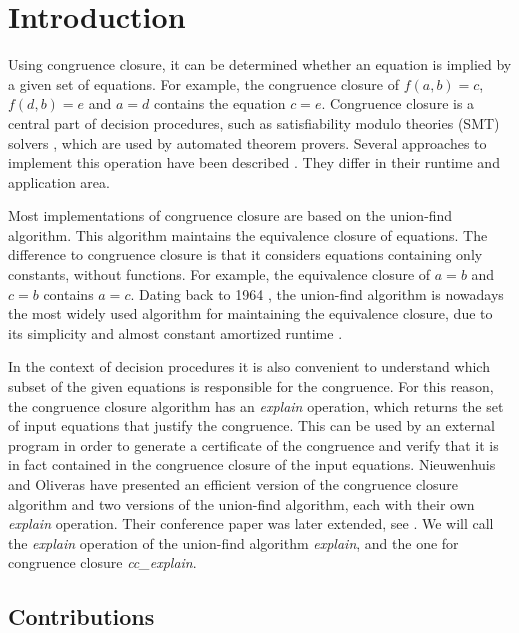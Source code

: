 
\chapter{Introduction}\label{chapter:introduction}

Using congruence closure, it can be determined whether an equation is implied by a given set of equations.
For example, the congruence closure of $f(a,b) = c$, $f(d,b) = e$ and $a = d$ contains the equation $c = e$.
Congruence closure is a central part of decision procedures, such as satisfiability modulo theories (SMT) solvers \cite{z3}, which are used by automated theorem provers.
Several approaches to implement this operation have been described \cite{congruenceclosure-og2,congruenceclosure-og,congruenceclosure-og3,Nieuwenhuis}.
They differ in their runtime and application area.

Most implementations of congruence closure are based on the union-find algorithm. This algorithm maintains the equivalence closure of equations. The difference to congruence closure is that it considers equations containing only constants, without functions.
For example, the
equivalence closure of $a = b$ and $c = b$ contains $a = c$.
Dating back to 1964 \cite{unionfind-og}, the union-find algorithm is nowadays the most widely used algorithm for maintaining the equivalence closure, due to its simplicity and almost constant amortized runtime \cite{Tarjan}.

In the context of decision procedures it is also convenient to understand which subset of the given equations is responsible for the congruence. For this reason, the congruence closure algorithm has an \emph{explain} operation, which returns the set of input equations that justify the congruence.
This can be used by an external program in order to generate a certificate of the congruence and verify that it is in fact contained in the congruence closure of the input equations.
Nieuwenhuis and Oliveras have presented an efficient version of the congruence closure algorithm and two versions of the union-find algorithm, each with their own \emph{explain} operation. Their conference paper \cite{Nieuwenhuis} was later extended, see \cite{Nieuwenhuis2}.
We will call the \emph{explain} operation of the union-find algorithm \emph{explain}, and the one for congruence closure \emph{cc\_explain}.

\section{Contributions}

